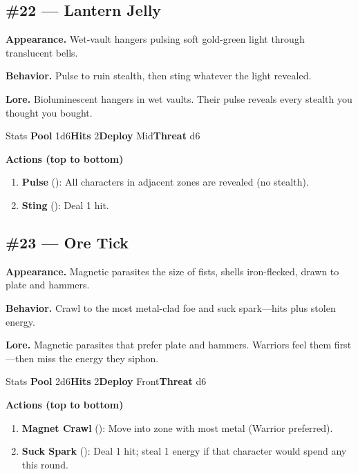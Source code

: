 \subsection*{\#22 --- Lantern Jelly}

\textbf{Appearance.} Wet-vault hangers pulsing soft gold-green light through translucent bells.

\textbf{Behavior.} Pulse to ruin stealth, then sting whatever the light revealed.

\textbf{Lore.} Bioluminescent hangers in wet vaults. Their pulse reveals every stealth you thought you bought.

\begin{monsterentry}{Stats}
\textbf{Pool} 1d6\quad\textbf{Hits} 2\quad\textbf{Deploy} Mid\quad\textbf{Threat} d6

\textbf{Actions (top to bottom)}
\begin{enumerate}\setlength{\itemsep}{0.15em}\setlength{\parskip}{0pt}
  \item \textbf{Pulse} (\easy): All characters in adjacent zones are revealed (no stealth).
  \item \textbf{Sting} (\medium): Deal 1 hit.
\end{enumerate}
\end{monsterentry}

\subsection*{\#23 --- Ore Tick}

\textbf{Appearance.} Magnetic parasites the size of fists, shells iron-flecked, drawn to plate and hammers.

\textbf{Behavior.} Crawl to the most metal-clad foe and suck spark---hits plus stolen energy.

\textbf{Lore.} Magnetic parasites that prefer plate and hammers. Warriors feel them first---then miss the energy they siphon.

\begin{monsterentry}{Stats}
\textbf{Pool} 2d6\quad\textbf{Hits} 2\quad\textbf{Deploy} Front\quad\textbf{Threat} d6

\textbf{Actions (top to bottom)}
\begin{enumerate}\setlength{\itemsep}{0.15em}\setlength{\parskip}{0pt}
  \item \textbf{Magnet Crawl} (\easy): Move into zone with most metal (Warrior preferred).
  \item \textbf{Suck Spark} (\medium): Deal 1 hit; steal 1 energy if that character would spend any this round.
\end{enumerate}
\end{monsterentry}

